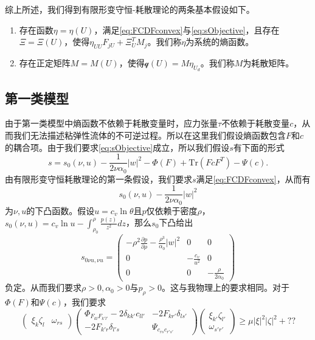 \documentclass{article}
\begin{document}
综上所述，我们得到有限形变守恒-耗散理论的两条基本假设如下。
\begin{enumerate}
		\item 存在函数$\eta = \eta (U)$，满足\eqref{eq:FCDFconvex}与\eqref{eq:sObjective}，且存在$\Xi=\Xi(U)$，使得$\eta_{UU} F_{jU} + \Xi_U^T M_j $。我们称$\eta$为系统的熵函数。
		\item 存在正定矩阵$M = M(U)$，使得$\mathcal{q}(U) = M \eta_{U_d}$。我们称$M$为耗散矩阵。
\end{enumerate}

\subsection{第一类模型}
由于第一类模型中熵函数不依赖于耗散变量时，应力张量$\tau$不依赖于耗散变量$c$，从而我们无法描述粘弹性流体的不可逆过程。所以在这里我们假设熵函数包含$F$和$c$的耦合项。由于我们要求\eqref{eq:sObjective}成立，所以我们假设$s$有下面的形式 
 $$s = s_0(\nu,u) - \frac{1}{2 \nu \alpha_0} |w|^2 - \Phi (F) + \mbox{Tr} (FcF^T) - \Psi(c) .$$
由有限形变守恒耗散理论的第一条假设，我们要求$s$满足\eqref{eq:FCDFconvex}，从而有
\begin{equation*}
	s_0(\nu,u) - \frac{1}{2\nu \alpha_0}|w|^2
\end{equation*}
为$\nu,u$的下凸函数。假设$u = c_v \ln \theta$且$p$仅依赖于密度$\rho$，$s_0(\nu,u) = c_v \ln u - \int_{\rho_0}^\rho \frac{p(z)}{z^2}dz$，那么$s_0$下凸给出
\begin{equation*}
	s_{0\nu u,\nu u} = \left( \begin{array}{ccc}
		- \rho^2 \frac{\partial p}{\partial \rho} - \frac{\rho^3}{\alpha_0}|w|^2 & 0 & 0 \\
		0 & -\frac{c_v}{u^2} & 0 \\
		0 & 0 & -\frac{\rho}{2\alpha_0}
	\end{array}\right)
\end{equation*}
负定。从而我们要求$\rho>0,\alpha_0>0$与$p_\rho>0$。这与我物理上的要求相同。对于$\Phi(F)$和$\Psi(c)$，我们要求
\begin{equation*}
	\left( \begin{array}{cc}
		\xi_k \zeta_l & \omega_{rs} 
	\end{array}\right)
	\left( \begin{array}{cc}
		\Phi_{F_{kl}F_{k'l'}} - 2\delta_{kk'} c_{ll'}& -2 F_{kr'} \delta_{ls'} \\
		-2 F_{k'r} \delta_{l's} & \Psi_{c_{rs}c_{r's'}}
	\end{array}\right) 
	\left( \begin{array}{c}
		\xi_{k'}  \zeta_{l'} \\ \omega_{s'r'} 
	\end{array}\right) \ge \mu |\xi|^2|\zeta|^2 + ??
\end{equation*}
\end{document}
